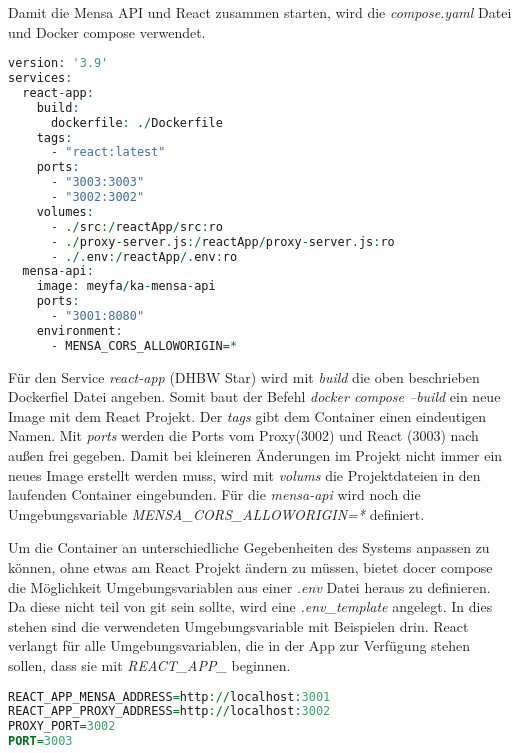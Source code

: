 Damit die Mensa API und React zusammen starten, wird die \emph{compose.yaml} Datei und Docker compose verwendet.

\begin{lstlisting}[language=vhdl,
	frame=single,           % Ein Rahmen um den Code
	framexleftmargin=15pt,  % Rahmen link von den Zahlen
	style=algoBericht,
	label={Dockerfile},
	captionpos=b           % Caption unter den Code setzen
	caption={compose.yaml für DHBW-Star}]
version: '3.9'
services:
  react-app:
    build:
      dockerfile: ./Dockerfile
    tags:
      - "react:latest"
    ports:
      - "3003:3003"
      - "3002:3002"
    volumes:
      - ./src:/reactApp/src:ro
      - ./proxy-server.js:/reactApp/proxy-server.js:ro
      - ./.env:/reactApp/.env:ro
  mensa-api:
    image: meyfa/ka-mensa-api
    ports:
      - "3001:8080"
    environment:
      - MENSA_CORS_ALLOWORIGIN=*
\end{lstlisting}

Für den Service \emph{react-app} (DHBW Star) wird mit \emph{build} die oben beschrieben Dockerfiel Datei angeben. Somit baut der Befehl \emph{docker compose --build} ein neue Image mit dem React Projekt.
Der \emph{tags} gibt dem Container einen eindeutigen Namen.
Mit \emph{ports} werden die Ports vom Proxy(3002) und React (3003) nach außen frei gegeben.
Damit bei kleineren Änderungen im Projekt nicht immer ein neues Image erstellt werden muss, wird mit \emph{volums} die Projektdateien in den laufenden Container eingebunden.
Für die \emph{mensa-api} wird noch die Umgebungsvariable \emph{MENSA\_CORS\_ALLOWORIGIN=*} definiert.

Um die Container an unterschiedliche Gegebenheiten des Systems anpassen zu können, ohne etwas am React Projekt ändern zu müssen, bietet docer compose die Möglichkeit Umgebungsvariablen aus einer \emph{.env} Datei heraus zu definieren.
Da diese nicht teil von git sein sollte, wird eine \emph{.env\_template} angelegt. In dies stehen sind die verwendeten Umgebungsvariable mit Beispielen drin.
React verlangt für alle Umgebungsvariablen, die in der App zur Verfügung stehen sollen, dass sie mit \emph{REACT\_APP\_} beginnen.

\begin{lstlisting}[language=vhdl,
	frame=single,           % Ein Rahmen um den Code
	framexleftmargin=15pt,  % Rahmen link von den Zahlen
	style=algoBericht,
	label={Dockerfile},
	captionpos=b           % Caption unter den Code setzen
	caption={.env für DHBW-Star}]
REACT_APP_MENSA_ADDRESS=http://localhost:3001 
REACT_APP_PROXY_ADDRESS=http://localhost:3002
PROXY_PORT=3002
PORT=3003
\end{lstlisting}

